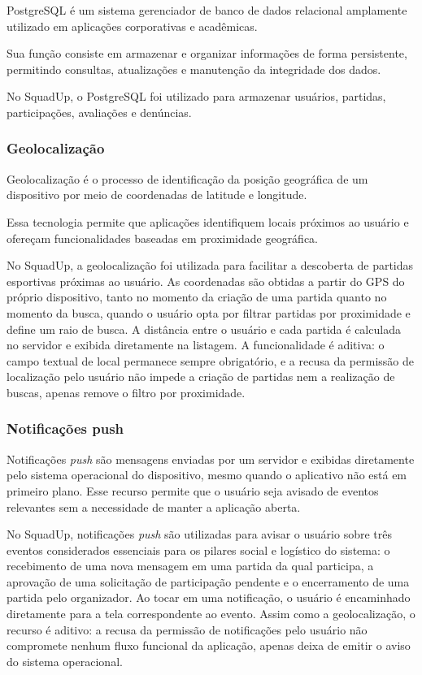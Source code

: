\documentclass[a4paper, 12pt]{article}
\begin{document}
\begin{justify}
PostgreSQL é um sistema gerenciador de banco de dados relacional amplamente utilizado em aplicações corporativas e acadêmicas.

Sua função consiste em armazenar e organizar informações de forma persistente, permitindo consultas, atualizações e manutenção da integridade dos dados.

No SquadUp, o PostgreSQL foi utilizado para armazenar usuários, partidas, participações, avaliações e denúncias.

\subsubsection{Geolocalização}

Geolocalização é o processo de identificação da posição geográfica de um dispositivo por meio de coordenadas de latitude e longitude.

Essa tecnologia permite que aplicações identifiquem locais próximos ao usuário e ofereçam funcionalidades baseadas em proximidade geográfica.

No SquadUp, a geolocalização foi utilizada para facilitar a descoberta de partidas esportivas próximas ao usuário. As coordenadas são obtidas a partir do GPS do próprio dispositivo, tanto no momento da criação de uma partida quanto no momento da busca, quando o usuário opta por filtrar partidas por proximidade e define um raio de busca. A distância entre o usuário e cada partida é calculada no servidor e exibida diretamente na listagem. A funcionalidade é aditiva: o campo textual de local permanece sempre obrigatório, e a recusa da permissão de localização pelo usuário não impede a criação de partidas nem a realização de buscas, apenas remove o filtro por proximidade.

\subsubsection{Notificações push}

Notificações \textit{push} são mensagens enviadas por um servidor e exibidas diretamente pelo sistema operacional do dispositivo, mesmo quando o aplicativo não está em primeiro plano. Esse recurso permite que o usuário seja avisado de eventos relevantes sem a necessidade de manter a aplicação aberta.

No SquadUp, notificações \textit{push} são utilizadas para avisar o usuário sobre três eventos considerados essenciais para os pilares social e logístico do sistema: o recebimento de uma nova mensagem em uma partida da qual participa, a aprovação de uma solicitação de participação pendente e o encerramento de uma partida pelo organizador. Ao tocar em uma notificação, o usuário é encaminhado diretamente para a tela correspondente ao evento. Assim como a geolocalização, o recurso é aditivo: a recusa da permissão de notificações pelo usuário não compromete nenhum fluxo funcional da aplicação, apenas deixa de emitir o aviso do sistema operacional.


\end{justify}
\end{document}
